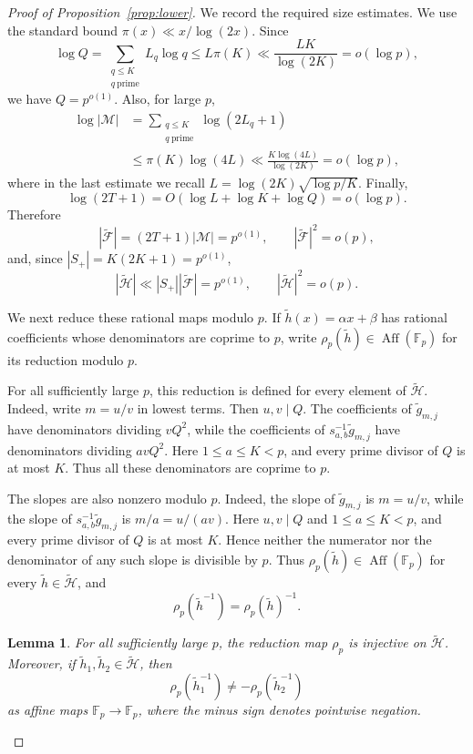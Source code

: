 \documentclass[11pt,letterpaper,reqno]{amsart}
\newtheorem{lemma}[theorem]{Lemma}
\theoremstyle{definition}
\newcommand{\F}{\mathbb F}
\newcommand{\1}{\mathbf 1}
\DeclareMathOperator{\Aff}{Aff}
\begin{document}
\begin{proof}[Proof of Proposition~\ref{prop:lower}]
We record the required size estimates.  We use the standard bound
$\pi(x)\ll x/\log (2 x)$.  Since
\[
    \log Q
    =\sum_{\substack{q\le K\\ q\ \mathrm{prime}}}L_q\log q
    \le L\pi(K)
    \ll \frac{LK}{\log(2K)}=o(\log p),
\]
we have $Q=p^{o(1)}$.  Also, for large $p$,
\[
\begin{aligned}
    \log |\mathcal M|
    &=\sum_{\substack{q\le K\\ q\ \mathrm{prime}}}\log(2L_q+1)  \\
    &\le \pi(K)\log(4L)
      \ll \frac{K\log(4L)}{\log(2K)}=o(\log p),
\end{aligned}
\]
where in the last estimate we recall $L= \log(2K)\sqrt{\log p/K}$.
Finally,
\[
    \log(2T+1)=O(\log L+\log K+\log Q)=o(\log p).
\]
Therefore
\[
        |\widetilde{\mathcal F}|= (2T+1)|\mathcal{M}|= p^{o(1)},
        \qquad
        |\widetilde{\mathcal F}|^2=o(p),
\]
and, since $|S_+|=K(2K+1)=p^{o(1)}$,
\begin{equation}\label{eq:H-size}
        |\widetilde{\mathcal H}|\ll |S_{+}| |\widetilde{\mathcal F}|  = p^{o(1)},
        \qquad
        |\widetilde{\mathcal H}|^2=o(p).
\end{equation}

We next reduce these rational maps modulo $p$.  If $\widetilde h(x)=\alpha x+\beta$ has rational coefficients whose denominators are coprime to $p$, write $\rho_p(\widetilde h)\in\Aff(\F_p)$ for its reduction modulo $p$.

For all sufficiently large $p$, this reduction is defined for every element of
$\widetilde{\mathcal H}$. Indeed, write $m=u/v$ in lowest terms.  Then
$u,v\mid Q$.  The coefficients of $\widetilde g_{m,j}$ have denominators
dividing $vQ^2$, while the coefficients of
$s_{a,b}^{-1}\widetilde g_{m,j}$ have denominators dividing $avQ^2$.
Here $1\le a\le K<p$, and every prime divisor of $Q$ is at most $K$.
Thus all these denominators are coprime to $p$.

The slopes are also nonzero modulo $p$.  Indeed, the slope of
$\widetilde g_{m,j}$ is $m=u/v$, while the slope of
$s_{a,b}^{-1}\widetilde g_{m,j}$ is $m/a=u/(av)$.  Here $u,v\mid Q$ and
$1\le a\le K<p$, and every prime divisor of $Q$ is at most $K$.  Hence
neither the numerator nor the denominator of any such slope is divisible by
$p$.  Thus $\rho_p(\widetilde h)\in\Aff(\F_p)$ for every
$\widetilde h\in\widetilde{\mathcal H}$, and
\[
        \rho_p(\widetilde h^{-1})=\rho_p(\widetilde h)^{-1}.
\]

\begin{lemma}\label{lem:no-collision}
For all sufficiently large $p$, the reduction map $\rho_p$ is injective on
$\widetilde{\mathcal H}$.  Moreover, if
$\widetilde h_1,\widetilde h_2\in\widetilde{\mathcal H}$, then
\[
        \rho_p(\widetilde h_1^{-1})\ne -\rho_p(\widetilde h_2^{-1})
\]
as affine maps $\F_p\to\F_p$, where the minus sign denotes pointwise negation.
\end{lemma}


\end{proof}
\end{document}
